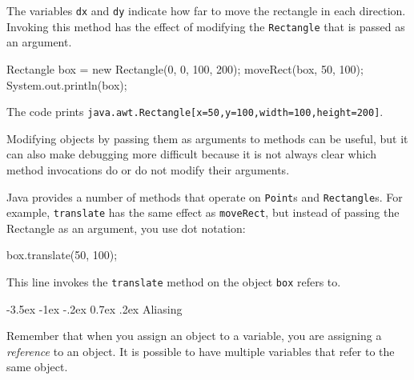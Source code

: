 \documentclass[12pt]{book}
\makeatletter
\theoremstyle{exercise}
\newcommand{\java}[1]{\verb"#1"}
\renewcommand{\section}{\@startsection{section}{1}{\z@}%
    {-3.5ex \@plus -1ex \@minus -.2ex}%
    {0.7ex \@plus.2ex}%
    {\normalfont\Large\bfseries}}
\newcommand{\java}[1]{\lstinline{#1}} %
\makeatother
\begin{document}
The variables \java{dx} and \java{dy} indicate how far to move the rectangle in each direction.
Invoking this method has the effect of modifying the \java{Rectangle} that is passed as an argument.

\begin{code}
    Rectangle box = new Rectangle(0, 0, 100, 200);
    moveRect(box, 50, 100);
    System.out.println(box);
\end{code}

The code prints \java{java.awt.Rectangle[x=50,y=100,width=100,height=200]}.

Modifying objects by passing them as arguments to methods can be useful, but it can also make debugging more difficult because it is not always clear which method invocations do or do not modify their arguments.

Java provides a number of methods that operate on \java{Point}s and \java{Rectangle}s.
For example, \java{translate} has the same effect as \java{moveRect}, but instead of passing the Rectangle as an argument, you use dot notation:

\begin{code}
    box.translate(50, 100);
\end{code}

This line invokes the \java{translate} method on the object \java{box} refers to.



\section{Aliasing}
\label{aliasing}


Remember that when you assign an object to a variable, you are assigning a {\em reference} to an object.
It is possible to have multiple variables that refer to the same object.
\end{document}
